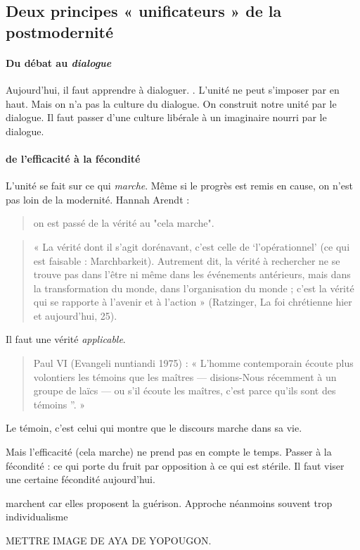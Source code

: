 \subsection{Deux principes « unificateurs » de la postmodernité}

\paragraph{Du débat au \textit{dialogue}} Aujourd'hui, il faut apprendre à dialoguer. . L'unité ne peut s'imposer par en haut. Mais on n'a pas la culture du dialogue. On construit notre unité par le dialogue. Il faut passer d'une culture libérale à un imaginaire nourri par le dialogue. 

\paragraph{de l'efficacité à la fécondité} L'unité se fait sur ce qui \textit{marche}. Même si le progrès est remis en cause, on n'est pas loin de la modernité. 
Hannah Arendt : 
\begin{quote}
    on est passé de la vérité au "cela marche".
\end{quote}
\begin{quote}
    « La vérité dont il s’agit dorénavant, c’est celle de ‘l’opérationnel’ (ce qui est faisable : Marchbarkeit). Autrement dit, la vérité à rechercher ne se trouve pas dans l’être ni même dans les événements antérieurs, mais dans la transformation du monde, dans l’organisation du monde ; c’est la vérité qui se rapporte à l’avenir et à l’action » (Ratzinger, La foi chrétienne
hier et aujourd’hui, 25).
\end{quote}
Il faut une vérité \textit{applicable}. 
\begin{quote}
    Paul VI (Evangeli nuntiandi 1975) : « L’homme contemporain écoute plus volontiers les
témoins que les maîtres — disions-Nous récemment à un groupe de laïcs — ou s’il écoute les
maîtres, c’est parce qu’ils sont des témoins ”. »
\end{quote}
Le témoin, c'est celui qui montre que le discours marche dans sa vie. 

Mais l'efficacité (cela marche) ne prend pas en compte le temps. Passer à la fécondité : ce qui porte du fruit par opposition à ce qui est stérile. Il faut viser une certaine fécondité aujourd'hui. 

\begin{Ex}
    marchent car elles proposent la guérison. 
    Approche néanmoins souvent trop individualisme

    METTRE IMAGE DE AYA DE YOPOUGON. 
\end{Ex}

